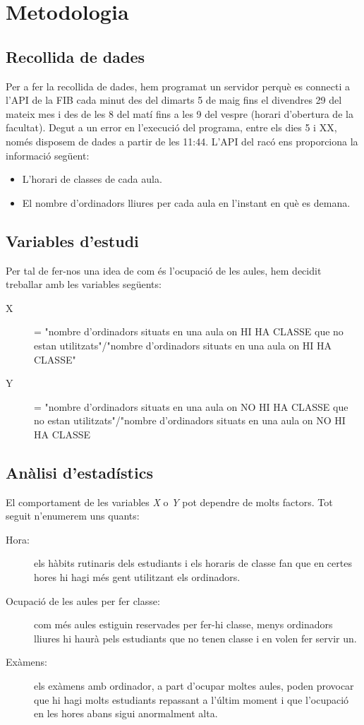 \section{Metodologia}

\subsection{Recollida de dades}
Per a fer la recollida de dades, hem programat un servidor perquè es connecti a l'API de la FIB cada minut des del dimarts 5 de maig fins el divendres 29 del mateix mes i des de les 8 del matí fins a les 9 del vespre (horari d'obertura de la facultat). Degut a un error en l'execució del programa, entre els dies 5 i XX, només disposem de dades a partir de les  11:44.
L'API del racó ens proporciona la informació següent:
\begin{itemize}
	\item L'horari de classes de cada aula.
	\item El nombre d'ordinadors lliures per cada aula en l'instant en què es demana.
\end{itemize}

\subsection{Variables d'estudi}
Per tal de fer-nos una idea de com és l'ocupació de les aules, hem decidit treballar amb les variables següents:
\begin{description}
	
	\item[X] = "nombre d'ordinadors situats en una aula on HI HA CLASSE que no estan utilitzats"/"nombre d'ordinadors situats en una aula on HI HA CLASSE"
	\item[Y] = "nombre d'ordinadors situats en una aula on NO HI HA CLASSE que no estan utilitzats"/"nombre d'ordinadors situats en una aula on NO HI HA CLASSE
\end{description}

 
\subsection{Anàlisi d'estadístics}
El comportament de les variables \emph{X} o \emph{Y} pot dependre de molts factors. Tot seguit n'enumerem uns quants:
\begin{description}
	\item[Hora:] els hàbits rutinaris dels estudiants i els horaris de classe fan que en certes hores hi hagi més gent utilitzant els ordinadors.
	\item[Ocupació de les aules per fer classe:] com més aules estiguin reservades per fer-hi classe, menys ordinadors lliures hi haurà pels estudiants que no tenen classe i en volen fer servir un.
	\item[Exàmens:] els exàmens amb ordinador, a part d'ocupar moltes aules, poden provocar que hi hagi molts estudiants repassant a l'últim moment i que l'ocupació en les hores abans sigui anormalment alta.
\end{description}




